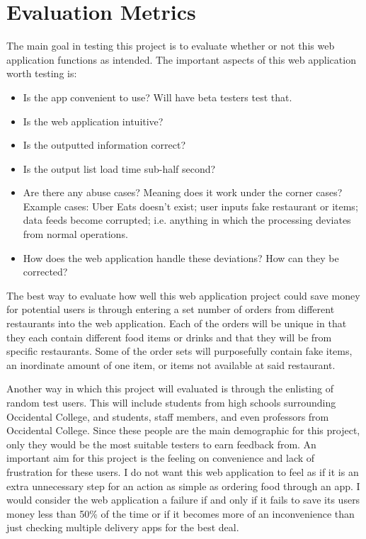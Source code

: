 \documentclass[10pt,twocolumn]{article}
\begin{document}
\section{Evaluation Metrics}

The main goal in testing this project is to evaluate whether or not this web application functions as intended. The important aspects of this web application worth testing is:

\begin{itemize}
    \item Is the app convenient to use? Will have beta testers test that.
    \item Is the web application intuitive?
    \item Is the outputted information correct?
    \item Is the output list load time sub-half second?
    \item Are there any abuse cases? Meaning does it work under the corner cases? 
    \subitem Example cases: Uber Eats doesn't exist; user inputs fake restaurant or items; data feeds become corrupted; i.e. anything in which the processing deviates from normal operations.
    \item How does the web application handle these deviations? How can they be corrected?
\end{itemize}

The best way to evaluate how well this web application project could save money for potential users is through entering a set number of orders from different restaurants into the web application. Each of the orders will be unique in that they each contain different food items or drinks and that they will be from specific restaurants. Some of the order sets will purposefully contain fake items, an inordinate amount of one item, or items not available at said restaurant.

Another way in which this project will evaluated is through the enlisting of random test users. This will include students from high schools surrounding Occidental College, and students, staff members, and even professors from Occidental College. Since these people are the main demographic for this project, only they would be the most suitable testers to earn feedback from. An important aim for this project is the feeling on convenience and lack of frustration for these users. I do not want this web application to feel as if it is an extra unnecessary step for an action as simple as ordering food through an app. I would consider the web application a failure if and only if it fails to save its users money less than 50\% of the time or if it becomes more of an inconvenience than just checking multiple delivery apps for the best deal.
\end{document}
